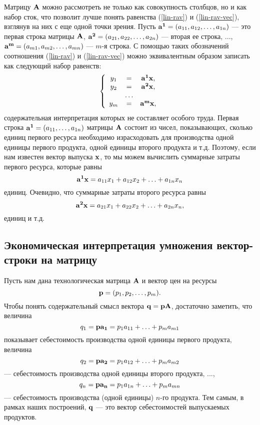     Матрицу $\mathbf{A}$ можно рассмотреть не только как совокупность
    столбцов, но и как набор сток,  что
    позволит лучше понять равенства  (\ref{lin-rav}) и (\ref{lin-rav-vec}),
    взглянув на
    них с еще одной точки зрения. Пусть $\mathbf{a^{1}}=(a_{11},a_{12},\ldots,a_{1n})$ --- это
    первая строка матрицы $\mathbf{A}$,  $\mathbf{a^{2}}=(a_{21},a_{22},\ldots,a_{2n})$ --- вторая ее строка,
    ..., $\mathbf{a^{m}}=(a_{m1},a_{m2},\ldots,a_{mn})$ --- $m$-я строка. С помощью таких
    обозначений соотношения (\ref{lin-rav}) и (\ref{lin-rav-vec})
    можно эквивалентным образом записать как следующий набор
    равенств:
\[\left\{
\begin{array}{ccc}
y_{1}&=&\mathbf{a^{1}}\mathbf{x},   \\
y_{2}&=&\mathbf{a^{2}}\mathbf{x}, \\
                      & \ldots &\\
y_{m}&=&\mathbf{a^{m}}\mathbf{x} , \\
\end{array} \right.\]
    содержательная интерпретация которых не составляет особого
    труда. Первая строка $\mathbf{a^{1}}=(a_{11},\ldots,a_{1n})$ матрицы
    $\mathbf{A}$ состоит из чисел, показывающих, сколько единиц
    первого ресурса необходимо израсходовать для
    производства одной единицы первого продукта, одной единицы второго продукта
    и т.д. Поэтому, если нам известен вектор выпуска $\mathbf{x}$, то мы
    можем вычислить суммарные затраты первого ресурса, которые равны
    \[\mathbf{a^{1}}\mathbf{x}= a_{11} x_1 + a_{12} x_2 + \ldots + a_{1n} x_n\]
    единиц. Очевидно, что суммарные затраты второго ресурса равны
    \[\mathbf{a^{2}}\mathbf{x} = a_{21} x_1 +  a_{22} x_2 + \ldots + a_{2n} x_n,\]
    единиц и т.д.


\subsection{Экономическая интерпретация умножения вектор-строки на матрицу}

   Пусть нам дана технологическая матрица $\mathbf{A}$ и вектор цен на ресурсы
    \[\mathbf{p}=(p_{1},p_{2},\ldots,p_{m}).\] Чтобы понять
    содержательный смысл вектора $\mathbf{q}=\mathbf{p}\mathbf{A}$, достаточно
    заметить, что величина
    \[q_{1}=\mathbf{p}\mathbf{a_{1}}=p_{1}a_{11}+\ldots+p_{m}a_{m1}\]
    показывает себестоимость производства одной единицы первого
    продукта, величина
    \[q_{2}=\mathbf{p}\mathbf{a_{2}}=p_{1}a_{12}+\ldots+p_{m}a_{m2}\]
    --- себестоимость производства одной единицы второго продукта,
    ...,
    \[q_{n}=\mathbf{p}\mathbf{a_{n}}=p_{1}a_{1n}+\ldots+p_{m}a_{mn}\]
    --- себестоимость производства (одной единицы) $n$-го продукта.
    Тем самым, в рамках наших построений, $\mathbf{q}$ --- это вектор
    себестоимостей выпускаемых продуктов.

